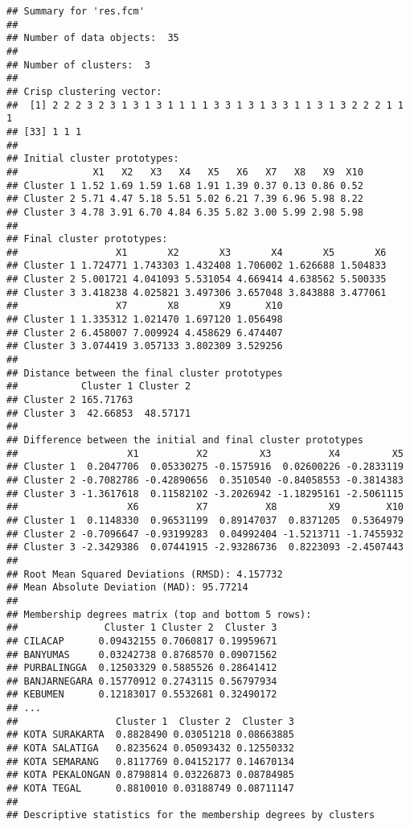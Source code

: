 \documentclass[
]{elegantbook}
\begin{document}
\begin{verbatim}
## Summary for 'res.fcm'
## 
## Number of data objects:  35 
## 
## Number of clusters:  3 
## 
## Crisp clustering vector:
##  [1] 2 2 2 3 2 3 1 3 1 3 1 1 1 1 3 3 1 3 1 3 3 1 1 3 1 3 2 2 2 1 1 1
## [33] 1 1 1
## 
## Initial cluster prototypes:
##             X1   X2   X3   X4   X5   X6   X7   X8   X9  X10
## Cluster 1 1.52 1.69 1.59 1.68 1.91 1.39 0.37 0.13 0.86 0.52
## Cluster 2 5.71 4.47 5.18 5.51 5.02 6.21 7.39 6.96 5.98 8.22
## Cluster 3 4.78 3.91 6.70 4.84 6.35 5.82 3.00 5.99 2.98 5.98
## 
## Final cluster prototypes:
##                 X1       X2       X3       X4       X5       X6
## Cluster 1 1.724771 1.743303 1.432408 1.706002 1.626688 1.504833
## Cluster 2 5.001721 4.041093 5.531054 4.669414 4.638562 5.500335
## Cluster 3 3.418238 4.025821 3.497306 3.657048 3.843888 3.477061
##                 X7       X8       X9      X10
## Cluster 1 1.335312 1.021470 1.697120 1.056498
## Cluster 2 6.458007 7.009924 4.458629 6.474407
## Cluster 3 3.074419 3.057133 3.802309 3.529256
## 
## Distance between the final cluster prototypes
##           Cluster 1 Cluster 2
## Cluster 2 165.71763          
## Cluster 3  42.66853  48.57171
## 
## Difference between the initial and final cluster prototypes
##                   X1          X2         X3          X4         X5
## Cluster 1  0.2047706  0.05330275 -0.1575916  0.02600226 -0.2833119
## Cluster 2 -0.7082786 -0.42890656  0.3510540 -0.84058553 -0.3814383
## Cluster 3 -1.3617618  0.11582102 -3.2026942 -1.18295161 -2.5061115
##                   X6          X7          X8         X9        X10
## Cluster 1  0.1148330  0.96531199  0.89147037  0.8371205  0.5364979
## Cluster 2 -0.7096647 -0.93199283  0.04992404 -1.5213711 -1.7455932
## Cluster 3 -2.3429386  0.07441915 -2.93286736  0.8223093 -2.4507443
## 
## Root Mean Squared Deviations (RMSD): 4.157732 
## Mean Absolute Deviation (MAD): 95.77214 
## 
## Membership degrees matrix (top and bottom 5 rows): 
##               Cluster 1 Cluster 2  Cluster 3
## CILACAP      0.09432155 0.7060817 0.19959671
## BANYUMAS     0.03242738 0.8768570 0.09071562
## PURBALINGGA  0.12503329 0.5885526 0.28641412
## BANJARNEGARA 0.15770912 0.2743115 0.56797934
## KEBUMEN      0.12183017 0.5532681 0.32490172
## ...
##                 Cluster 1  Cluster 2  Cluster 3
## KOTA SURAKARTA  0.8828490 0.03051218 0.08663885
## KOTA SALATIGA   0.8235624 0.05093432 0.12550332
## KOTA SEMARANG   0.8117769 0.04152177 0.14670134
## KOTA PEKALONGAN 0.8798814 0.03226873 0.08784985
## KOTA TEGAL      0.8810010 0.03188749 0.08711147
## 
## Descriptive statistics for the membership degrees by clusters

\end{verbatim}
\end{document}
